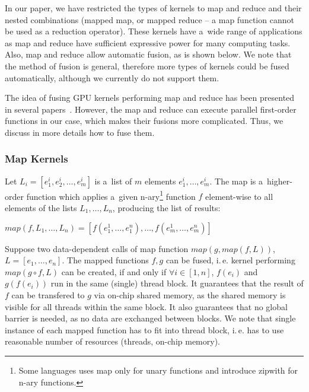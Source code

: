 \documentclass[final]{siamltex}
\def\ie{i.\,e.}
\begin{document}
In our paper, we have restricted the types of kernels to map and reduce and their nested combinations (mapped map, or mapped reduce -- a map function cannot be used as a reduction operator). These kernels have a~wide range of applications as map and reduce have sufficient expressive power for many computing tasks. Also, map and reduce allow automatic fusion, as is shown below.
We note that the method of fusion is general, therefore more types of kernels could be fused automatically, although we currently do not support them. 

The idea of fusing GPU kernels performing map and reduce has been presented in several papers~\cite{sato2009skeletal, larsen2011simple, catanzaro2011copperhead, tarditi2006accelerator}. However, the map and reduce can execute parallel first-order functions in our case, which makes their fusions more complicated. Thus, we discuss in more details how to fuse them.

\subsubsection{Map Kernels}

Let $L_i = [e^i_1, e^i_2,\dotsc, e^i_m]$ is a~list of $m$ elements $e^i_1,\dotsc, e^i_m$. The map is a~higher-order function which applies a~given n-ary\footnote{Some languages uses map only for unary functions and introduce zipwith for n-ary functions.} function $f$ element-wise to all elements of the lists $L_1,\dotsc, L_n$, producing the list of results:

\begin{center}
        $map(f, L_1,\dotsc, L_n) = [f(e^1_1,\dotsc, e^n_1),\dotsc, f(e^1_m,\dotsc, e^n_m)]$
\end{center}

Suppose two data-dependent calls of map function $map(g, map(f, L))$, $L = [e_1, \dotsc, e_n]$. The mapped functions $f, g$ can be fused, \ie{} kernel performing $map(g \circ f, L)$ can be created, if and only if $\forall i \in [1, n]$, $f(e_i)$ and $g(f(e_i))$ run in the same (single) thread block. It guarantees that the result of $f$ can be transfered to $g$ via on-chip shared memory, as the shared memory is visible for all threads within the same block. It also guarantees that no global barrier is needed, as no data are exchanged between blocks.  We note that single instance of each mapped function has to fit into thread block, \ie{} has to use reasonable number of resources (threads, on-chip memory).
\end{document}
